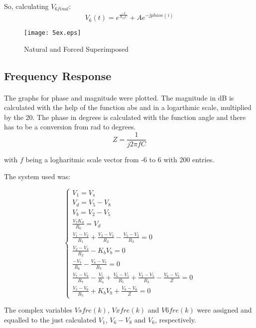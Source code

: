So, calculating $V_{6final}$:
\begin{equation}
	V_{6}(t) = e^{\frac{-t}{R_{eq} C}} + A e^{-j phase(i)}
\end{equation}

\begin{figure}[H]
    \texttt{[image: 5ex.eps]}
    \centering
    \caption{Natural and Forced Superimposed}
    \label{pha}
\end{figure}




\subsection{Frequency Response}
\paragraph{}

\par The graphs for phase and magnitude were plotted. The magnitude in dB is calculated with the help of the function abs and in a logarthmic scale, multiplied by the 20. The phase in degrees is calculated with the function angle and there has to be a conversion from rad to degrees.
\begin{equation}
	Z=\frac{1}{j 2 \pi f C}
\end{equation}

with $f$ being a logharitmic scale vector from -6 to 6 with 200 entries.

The system used was:

$$
\begin{cases} 
	V_1 = V_s \\ 
	V_d = V_5 -V_8 \\
	V_b = V_2 - V_5 \\
	\frac{V_7 K_d}{R_6} = V_d \\ 
	\frac{V_1 - V_2}{R_1} + \frac{V_3 - V_2}{R_2} - \frac{V_5 - V_2}{R_3}  = 0 \\
	\frac{V_2 - V_3}{R_2} - K_b V_b = 0 \\
	\frac{-V_7}{R_6} -\frac{V_8 - V_7}{R_7} = 0 \\
	\frac{V_7 - V_8}{R_7} - \frac{V_5}{R_4} + \frac{V_6 - V_5}{R_5} + \frac{V_2 - V_5}{R_3} - \frac{V_6 - V_8}{Z}= 0 \\
	\frac{V_5 - V_6}{R_5} + K_b V_b + \frac{V_8 - V_6}{Z}= 0 
\label{system 6}
\end{cases}
$$

The complex variables $Vsfre(k)$, $Vxfre(k)$ and $V6fre(k)$ were assigned and equalled to the just calculated $V_1$, $V_6 - V_8$ and $V_6$, respectively. 

